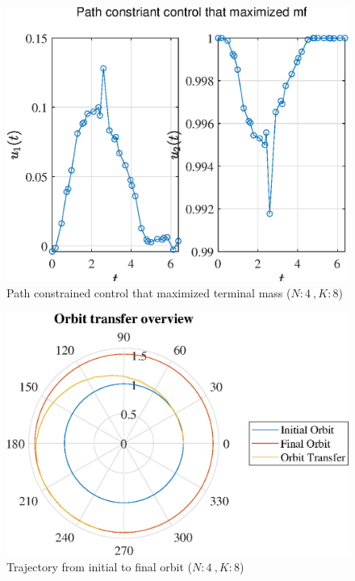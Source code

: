 \documentclass[]{article}
\begin{document}
	\begin{figure}
		\centering
		\includegraphics[scale=0.75]{path_N4_K8_C3_mf.eps}
		\caption{Path constrained control that maximized terminal mass (\(N:4\ , K:8\))}
		\label{fig:path_N4_K8_C3_mf}
	\end{figure}
	\begin{figure}
		\centering
		\includegraphics[scale=0.75]{orbit_N4_K8_C3_mf.eps}
		\caption{Trajectory from initial to final orbit (\(N:4\ , K:8\))}
		\label{fig:orbit_N4_K8_C3_mf}
	\end{figure}
\end{document}
